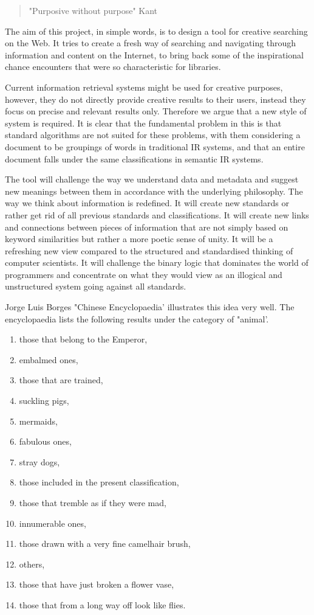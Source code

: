 \begin{quote}
  "Purposive without purpose" Kant
\end{quote}

The aim of this project, in simple words, is to design a tool for creative searching on the Web. It tries to create a fresh way of searching and navigating through information and content on the Internet, to bring back some of the inspirational chance encounters that were so characteristic for libraries.

Current information retrieval systems might be used for creative purposes, however, they do not directly provide creative results to their users, instead they focus on precise and relevant results only. Therefore we argue that a new style of system is required. It is clear that the fundamental problem in this is that standard algorithms are not suited for these problems, with them considering a document to be groupings of words in traditional IR systems, and that an entire document falls under the same classifications in semantic IR systems.

The tool will challenge the way we understand data and metadata and suggest new meanings between them in accordance with the underlying philosophy. The way we think about information is redefined. It will create new standards or rather get rid of all previous standards and classifications. It will create new links and connections between pieces of information that are not simply based on keyword similarities but rather a more poetic sense of unity. It will be a refreshing new view compared to the structured and standardised thinking of computer scientists. It will challenge the binary logic that dominates the world of programmers and concentrate on what they would view as an illogical and unstructured system going against all standards.

Jorge Luis Borges "Chinese Encyclopaedia' \citep{Borges2000} illustrates this idea very well. The encyclopaedia lists the following results under the category of "animal'.

\begin{enumerate}
  \item those that belong to the Emperor,
  \item embalmed ones,
  \item those that are trained,
  \item suckling pigs,
  \item mermaids,
  \item fabulous ones,
  \item stray dogs,
  \item those included in the present classification,
  \item those that tremble as if they were mad,
  \item innumerable ones,
  \item those drawn with a very fine camelhair brush,
  \item others,
  \item those that have just broken a flower vase,
  \item those that from a long way off look like flies.
\end{enumerate}

